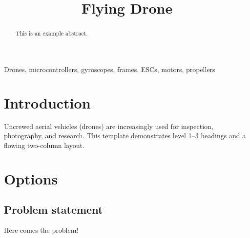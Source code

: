 \documentclass[conference]{IEEEtran}
\begin{document}
\title{Flying Drone}

\author{
    \and
    \and
    \and
    \and
}

\maketitle

\begin{abstract}
This is an example abstract.
\end{abstract}

\begin{IEEEkeywords}
Drones, microcontrollers, gyroscopes, frames, ESCs, motors, propellers
\end{IEEEkeywords}

\section{Introduction}
Uncrewed aerial vehicles (drones) are increasingly used for inspection, photography, and research. This template demonstrates level 1--3 headings and a flowing two-column layout.

\section{Options}
\subsection{Problem statement}
Here comes the problem!
\end{document}
